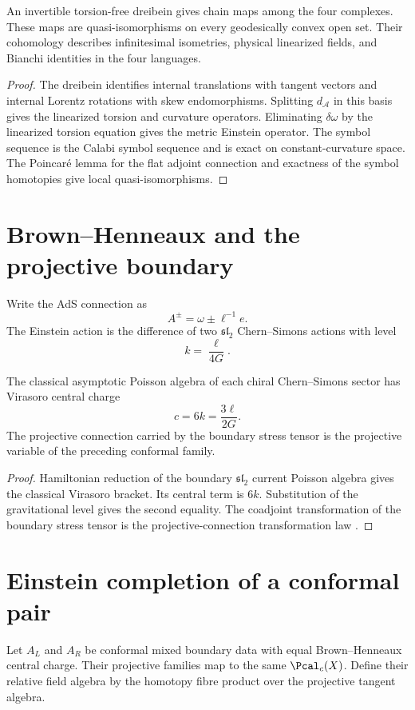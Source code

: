 \begin{theorem}
An invertible torsion-free dreibein gives chain maps among the four complexes.  These maps are quasi-isomorphisms on every geodesically convex open set.  Their cohomology describes infinitesimal isometries, physical linearized fields, and Bianchi identities in the four languages.
\end{theorem}
\begin{proof}
The dreibein identifies internal translations with tangent vectors and internal Lorentz rotations with skew endomorphisms.  Splitting $d_{\mathcal A}$ in this basis gives the linearized torsion and curvature operators.  Eliminating $\delta\omega$ by the linearized torsion equation gives the metric Einstein operator.  The symbol sequence is the Calabi symbol sequence and is exact on constant-curvature space.  The Poincar\'e lemma for the flat adjoint connection and exactness of the symbol homotopies give local quasi-isomorphisms.
\end{proof}

\chapter{Brown--Henneaux and the projective boundary}
Write the AdS connection as
\[
 A^\pm=\omega\pm\ell^{-1}e.
\]
The Einstein action is the difference of two $\mathfrak{sl}_2$ Chern--Simons actions with level
\[
 k=\frac{\ell}{4G}.
\]

\begin{theorem}
The classical asymptotic Poisson algebra of each chiral Chern--Simons sector has Virasoro central charge
\[
 c=6k=\frac{3\ell}{2G}.
\]
The projective connection carried by the boundary stress tensor is the projective variable of the preceding conformal family.
\end{theorem}
\begin{proof}
Hamiltonian reduction of the boundary $\mathfrak{sl}_2$ current Poisson algebra gives the classical Virasoro bracket.  Its central term is $6k$.  Substitution of the gravitational level gives the second equality.  The coadjoint transformation of the boundary stress tensor is the projective-connection transformation law 
\cite{BrownHenneaux}.
\end{proof}

\chapter{Einstein completion of a conformal pair}
Let $A_L$ and $A_R$ be conformal mixed boundary data with equal Brown--Henneaux central charge.  Their projective families map to the same $\Pcal_c(X)$.  Define their relative field algebra by the homotopy fibre product over the projective tangent algebra.

